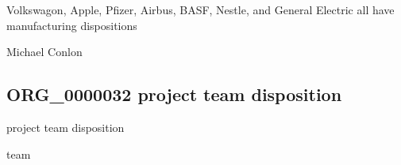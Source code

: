 \documentclass[letterpaper,10pt,english]{sphinxmanual}
\begin{document}
\begin{sphinxShadowBox}

\sphinxAtStartPar
Volkswagon, Apple, Pfizer, Airbus, BASF, Nestle, and General Electric all have manufacturing dispositions
\end{sphinxShadowBox}

\begin{sphinxShadowBox}

\sphinxAtStartPar
{}
\end{sphinxShadowBox}

\begin{sphinxShadowBox}

\sphinxAtStartPar
Michael Conlon 
\end{sphinxShadowBox}

\begin{sphinxShadowBox}

\sphinxAtStartPar
{}
\end{sphinxShadowBox}
\begin{quote}

\ignorespaces \end{quote}


\subsection{ORG\_0000032 \sphinxhyphen{} project team disposition}
\label{\detokenize{doc-ORG_0000032:org-0000032-project-team-disposition}}\label{\detokenize{doc-ORG_0000032:index-0}}\label{\detokenize{doc-ORG_0000032::doc}}
\begin{sphinxShadowBox}

\sphinxAtStartPar
project team disposition
\end{sphinxShadowBox}

\begin{sphinxShadowBox}

\sphinxAtStartPar
team
\end{sphinxShadowBox}
\end{document}
